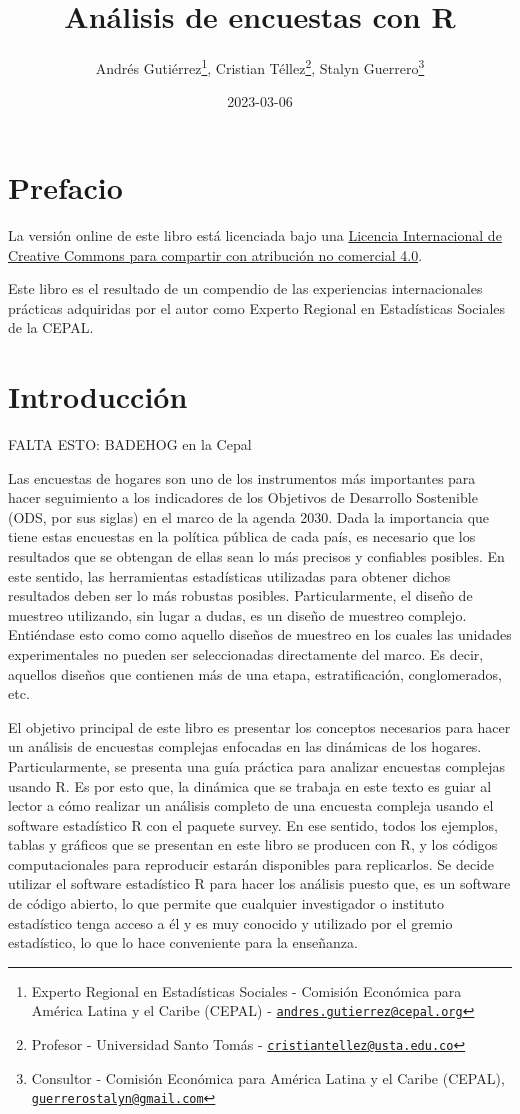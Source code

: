 \documentclass[
  12pt,
]{book}
\title{Análisis de encuestas con R}
\author{Andrés Gutiérrez\footnote{Experto Regional en Estadísticas Sociales - Comisión Económica para América Latina y el Caribe (CEPAL) - \href{mailto:andres.gutierrez@cepal.org}{\nolinkurl{andres.gutierrez@cepal.org}}}, Cristian Téllez\footnote{Profesor - Universidad Santo Tomás - \href{mailto:cristiantellez@usta.edu.co}{\nolinkurl{cristiantellez@usta.edu.co}}}, Stalyn Guerrero\footnote{Consultor - Comisión Económica para América Latina y el Caribe (CEPAL), \href{mailto:guerrerostalyn@gmail.com}{\nolinkurl{guerrerostalyn@gmail.com}}}}
\date{2023-03-06}
\begin{document}
\maketitle

{
\hypersetup{linkcolor=}
\setcounter{tocdepth}{1}
\tableofcontents
}
\listoffigures
\listoftables
\hypertarget{prefacio}{%
\chapter*{Prefacio}\label{prefacio}}

La versión online de este libro está licenciada bajo una \href{http://creativecommons.org/licenses/by-nc-sa/4.0/}{Licencia Internacional de Creative Commons para compartir con atribución no comercial 4.0}.

Este libro es el resultado de un compendio de las experiencias internacionales prácticas adquiridas por el autor como Experto Regional en Estadísticas Sociales de la CEPAL.

\hypertarget{introducciuxf3n}{%
\chapter{Introducción}\label{introducciuxf3n}}

FALTA ESTO: BADEHOG en la Cepal

Las encuestas de hogares son uno de los instrumentos más importantes para hacer seguimiento a los indicadores de los Objetivos de Desarrollo Sostenible (ODS, por sus siglas) en el marco de la agenda 2030. Dada la importancia que tiene estas encuestas en la política pública de cada país, es necesario que los resultados que se obtengan de ellas sean lo más precisos y confiables posibles. En este sentido, las herramientas estadísticas utilizadas para obtener dichos resultados deben ser lo más robustas posibles. Particularmente, el diseño de muestreo utilizando, sin lugar a dudas, es un diseño de muestreo complejo. Entiéndase esto como como aquello diseños de muestreo en los cuales las unidades experimentales no pueden ser seleccionadas directamente del marco. Es decir, aquellos diseños que contienen más de una etapa, estratificación, conglomerados, etc.

El objetivo principal de este libro es presentar los conceptos necesarios para hacer un análisis de encuestas complejas enfocadas en las dinámicas de los hogares. Particularmente, se presenta una guía práctica para analizar encuestas complejas usando R. Es por esto que, la dinámica que se trabaja en este texto es guiar al lector a cómo realizar un análisis completo de una encuesta compleja usando el software estadístico R con el paquete survey. En ese sentido, todos los ejemplos, tablas y gráficos que se presentan en este libro se producen con R, y los códigos computacionales para reproducir estarán disponibles para replicarlos. Se decide utilizar el software estadístico R para hacer los análisis puesto que, es un software de código abierto, lo que permite que cualquier investigador o instituto estadístico tenga acceso a él y es muy conocido y utilizado por el gremio estadístico, lo que lo hace conveniente para la enseñanza.
\end{document}
